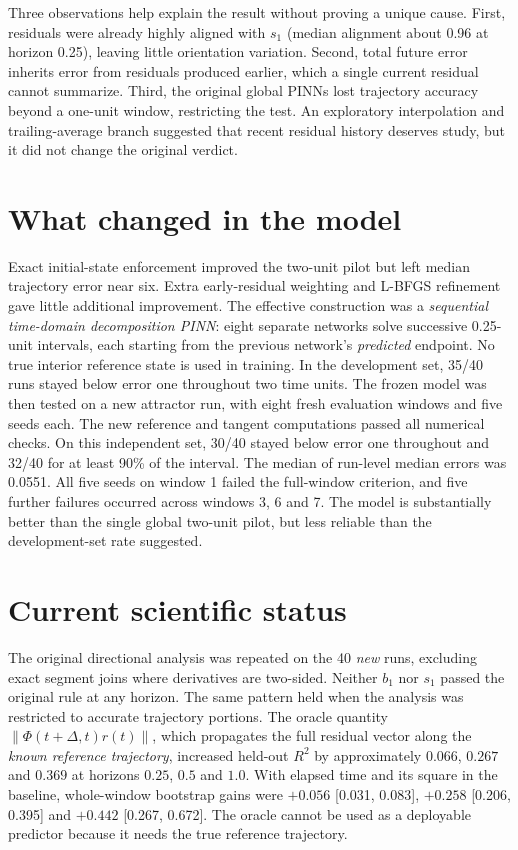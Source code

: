 \documentclass[11pt,a4paper]{article}
\begin{document}
Three observations help explain the result without proving a unique cause.
First, residuals were already highly aligned with $s_1$ (median alignment
about 0.96 at horizon 0.25), leaving little orientation variation. Second,
total future error inherits error from residuals produced earlier, which a
single current residual cannot summarize. Third, the original global PINNs
lost trajectory accuracy beyond a one-unit window, restricting the test.
An exploratory interpolation and trailing-average branch suggested that
recent residual history deserves study, but it did not change the original
verdict.

\section*{What changed in the model}
Exact initial-state enforcement improved the two-unit pilot but left median
trajectory error near six. Extra early-residual weighting and L-BFGS
refinement gave little additional improvement. The effective construction
was a \emph{sequential time-domain decomposition PINN}: eight separate
networks solve successive 0.25-unit intervals, each starting from the
previous network's \emph{predicted} endpoint. No true interior reference
state is used in training. In the development set, 35/40 runs stayed below
error one throughout two time units. The frozen model was then tested on a
new attractor run, with eight fresh evaluation windows and five seeds each.
The new reference and tangent computations passed all numerical checks.
On this independent set, 30/40 stayed below error one throughout and 32/40
for at least 90\% of the interval. The median of run-level median errors
was 0.0551. All five seeds on window 1 failed the full-window criterion,
and five further failures occurred across windows 3, 6 and 7. The model
is substantially better than the single global two-unit pilot, but less
reliable than the development-set rate suggested.

\section*{Current scientific status}
The original directional analysis was repeated on the 40 \emph{new} runs,
excluding exact segment joins where derivatives are two-sided. Neither
$b_1$ nor $s_1$ passed the original rule at any horizon. The same pattern
held when the analysis was restricted to accurate trajectory portions.
The oracle quantity
$\|\Phi(t+\Delta,t)r(t)\|$, which propagates the full residual vector
along the \emph{known reference trajectory}, increased held-out $R^2$ by
approximately $0.066$, $0.267$ and $0.369$ at horizons $0.25$, $0.5$ and
$1.0$. With elapsed time and its square in the baseline, whole-window
bootstrap gains were $+0.056$ [0.031, 0.083], $+0.258$ [0.206, 0.395]
and $+0.442$ [0.267, 0.672]. The oracle cannot be used as a deployable
predictor because it needs the true reference trajectory.
\end{document}
